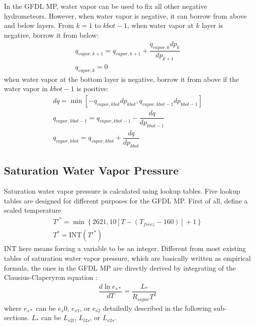 \documentclass[letterpaper,titlepage,10pt]{article}
\numberwithin{equation}{section}
\begin{document}
In the GFDL MP, water vapor can be used to fix all other negative hydrometeors. However, when water vapor is negative, it can borrow from above and below layers. From $k = 1$ to $kbot - 1$, when water vapor at $k$ layer is negative, borrow it from below:
\begin{gather}
	q_{vapor,k+1} = q_{vapor,k+1} + \dfrac{q_{vapor,k} dp_k}{dp_{k+1}} \\
	q_{vapor,k} = 0
\end{gather}
when water vapor at the bottom layer is negative, borrow it from above if the water vapor in $kbot - 1$ is positive:
\begin{gather}
	dq = \min \left[-q_{vapor,kbot} dp_{kbot}, q_{vapor,kbot-1} dp_{kbot-1} \right] \\
	q_{vapor,kbot-1} = q_{vapor,kbot-1} - \dfrac{dq}{dp_{kbot-1}} \\
	q_{vapor,kbot} = q_{vapor,kbot} + \dfrac{dq}{dp_{kbot}}
\end{gather}


\subsection{Saturation Water Vapor Pressure}

Saturation water vapor pressure is calculated using lookup tables. Five lookup tables are designed for different purposes for the GFDL MP. First of all, define a scaled temperature
\begin{gather}
	T'^* = \min \left\{2621, 10 \left[T - \left(T_{freez} - 160 \right) \right] + 1 \right\} \\
	T^* = \textrm{INT} \left(T'^* \right)
\end{gather}
$\textrm{INT}$ here means forcing a variable to be an integer. Different from most existing tables of saturation water vapor pressure, which are basically written as empirical formula, the ones in the GFDL MP are directly derived by integrating of the Clausius-Claperyron equation \citep{wallace1977atmo}:
\begin{gather}
	\dfrac{d \ln e_{s*}}{dT} = \dfrac{L_*}{R_{vapor} T^2}
\end{gather}
where $e_{s*}$ can be $e_s0$, $e_{s1}$, or $e_{s2}$ detailedly described in the following sub-sections. $L_*$ can be $L_{v2l}$, $L_{l2s}$, or $L_{v2s}$.

\end{document}

